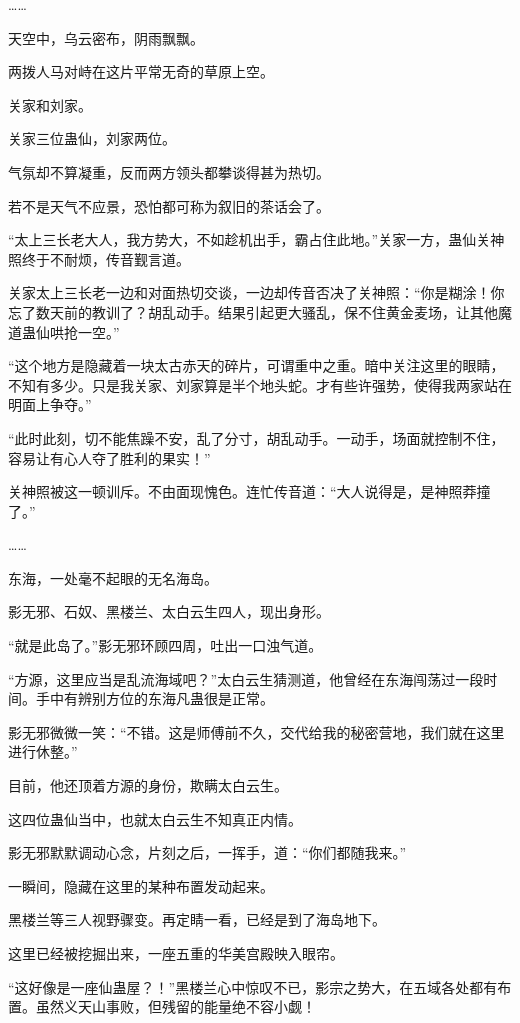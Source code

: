 \begin{this_body}
……

天空中，乌云密布，阴雨飘飘。

两拨人马对峙在这片平常无奇的草原上空。

关家和刘家。

关家三位蛊仙，刘家两位。

气氛却不算凝重，反而两方领头都攀谈得甚为热切。

若不是天气不应景，恐怕都可称为叙旧的茶话会了。

“太上三长老大人，我方势大，不如趁机出手，霸占住此地。”关家一方，蛊仙关神照终于不耐烦，传音觐言道。

关家太上三长老一边和对面热切交谈，一边却传音否决了关神照：“你是糊涂！你忘了数天前的教训了？胡乱动手。结果引起更大骚乱，保不住黄金麦场，让其他魔道蛊仙哄抢一空。”

“这个地方是隐藏着一块太古赤天的碎片，可谓重中之重。暗中关注这里的眼睛，不知有多少。只是我关家、刘家算是半个地头蛇。才有些许强势，使得我两家站在明面上争夺。”

“此时此刻，切不能焦躁不安，乱了分寸，胡乱动手。一动手，场面就控制不住，容易让有心人夺了胜利的果实！”

关神照被这一顿训斥。不由面现愧色。连忙传音道：“大人说得是，是神照莽撞了。”

……

东海，一处毫不起眼的无名海岛。

影无邪、石奴、黑楼兰、太白云生四人，现出身形。

“就是此岛了。”影无邪环顾四周，吐出一口浊气道。

“方源，这里应当是乱流海域吧？”太白云生猜测道，他曾经在东海闯荡过一段时间。手中有辨别方位的东海凡蛊很是正常。

影无邪微微一笑：“不错。这是师傅前不久，交代给我的秘密营地，我们就在这里进行休整。”

目前，他还顶着方源的身份，欺瞒太白云生。

这四位蛊仙当中，也就太白云生不知真正内情。

影无邪默默调动心念，片刻之后，一挥手，道：“你们都随我来。”

一瞬间，隐藏在这里的某种布置发动起来。

黑楼兰等三人视野骤变。再定睛一看，已经是到了海岛地下。

这里已经被挖掘出来，一座五重的华美宫殿映入眼帘。

“这好像是一座仙蛊屋？！”黑楼兰心中惊叹不已，影宗之势大，在五域各处都有布置。虽然义天山事败，但残留的能量绝不容小觑！


\end{this_body}
